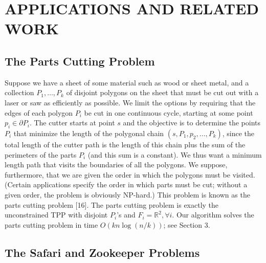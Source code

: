 \documentclass[a4paper]{article}
\begin{document}
\section{APPLICATIONS AND RELATED WORK}

\subsection{The Parts Cutting Problem}

Suppose we have a sheet of some material such as wood or sheet metal, and a collection \(P_1, \dots, P_k\) of disjoint polygons on the sheet that must be cut out with a laser or saw as eﬃciently as possible. We limit the options by requiring that the edges of each polygon \(P_i\) be cut in one continuous cycle, starting at some point \(p_i \in \partial P_i\). The cutter starts at point \(s\) and the objective is to determine the points \(P_i\) that minimize the length of the polygonal chain \((s, P_1, p_2, \dots, P_k)\), since the total length of the cutter path is the length of this chain plus the sum of the perimeters of the parts \(P_i\) (and this sum is a constant). We thus want a minimum length path that visits the boundaries of all the polygons. We suppose, furthermore, that we are given the order in which the polygons must be visited. (Certain applications specify the order in which parts must be cut; without a given order, the problem is obviously NP-hard.) This problem is known as the parts cutting problem [16]. The parts cutting problem is exactly the unconstrained TPP with disjoint \(P_i\)'s and \(F_i = \mathbb{R} ^ 2, \forall i\). Our algorithm solves the parts cutting problem in time \(O(k n \log(n / k))\); see Section 3.

\subsection{The Safari and Zookeeper Problems}
\end{document}
